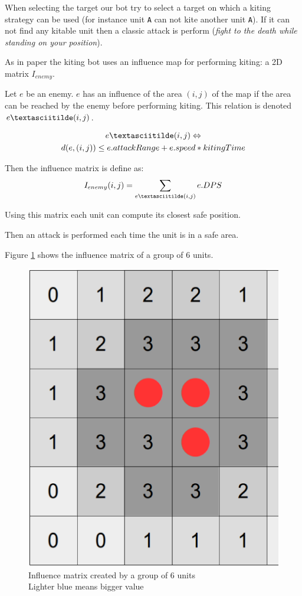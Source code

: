 When selecting the target our bot try to select a target on which a kiting strategy can be used (for instance unit \texttt{A} can not kite another unit \texttt{A}). 
If it can not find any kitable unit then a classic attack is perform (\emph{fight to the death while standing on your position}).

As in paper \cite{kiting} the kiting bot uses an influence map for performing kiting: a 2D matrix $I_{enemy}$.

Let $e$ be an enemy. $e$ has an influence of the area $(i,j)$ of the map if the area can be reached by the enemy before performing kiting.
This relation is denoted $e \textasciitilde (i,j)$.

\begin{multline*}
    e \textasciitilde (i,j) \Leftrightarrow \\ d(e,(i,j)) \leq e.attackRange + e.speed * kitingTime
\end{multline*}

Then the influence matrix is define as:
$$
I_{enemy}(i,j) = \sum_{e \textasciitilde (i,j)}e.DPS  
$$

Using this matrix each unit can compute its closest safe position.

Then an attack is performed each time the unit is in a safe area.

Figure \ref{influenceMatrix} shows the influence matrix of a group of 6 units.

\begin{center}
    \begin{figure}
        \centering
        \includegraphics[width=0.8\columnwidth]{fig/InfluenceMap.ps}
        \caption{Influence matrix created by a group of 6 units \\ 
        Lighter blue means bigger value}
        \label{influenceMatrix}
    \end{figure}
\end{center}

